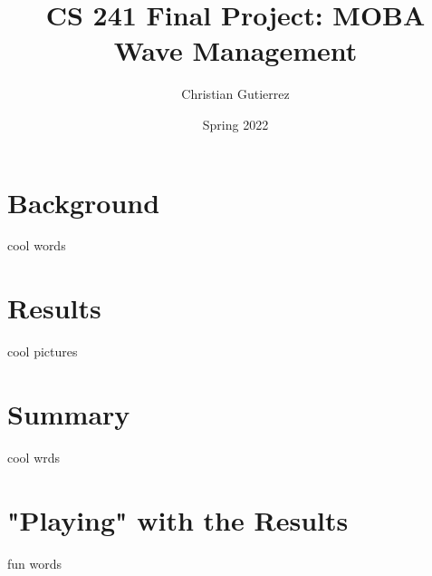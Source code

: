 \documentclass{article}
\title{CS 241 Final Project: MOBA Wave Management}
\author{Christian Gutierrez}
\date{Spring 2022}
\begin{document}
\maketitle

\newpage
\section{Background}
cool words

\newpage
\section{Results}
cool pictures

\newpage
\section{Summary}
cool wrds

\newpage
\section{"Playing" with the Results}
fun words
\end{document}
